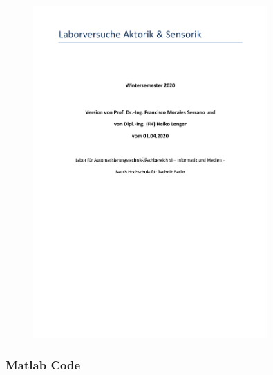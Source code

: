 \begin{figure}[H]
    \centering
    \includegraphics[page=4, width=0.8\textwidth]{../Aufgabenstellung.pdf}
    \label{fig:Aufgabenstellung A1}
\end{figure}

\subsubsection{Matlab Code}






